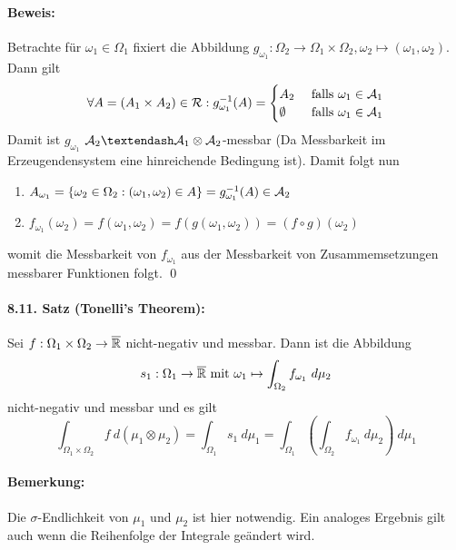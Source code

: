 \paragraph{Beweis:}Betrachte f\"ur $\omega_1\in\Omega_1$ fixiert die Abbildung $g_{\omega_1}:\Omega_2\to\Omega_1\times\Omega_2,\omega_2\mapsto(\omega_1,\omega_2)$. Dann gilt
\begin{align*}
    \forall A=(A_1\times A_2)\in\mathcal{R}:g_{\omega_1}^{-1}(A)=
    \begin{cases}
        A_2&\text{ falls }\omega_1\in\mathcal{A}_1\\
        \emptyset&\text{ falls }\omega_1\in\mathcal{A}_1
    \end{cases}
\end{align*}
Damit ist $g_{\omega_1}$ $\A_2\textendash\A_1\otimes\A_2$-messbar (Da Messbarkeit im Erzeugendensystem eine hinreichende Bedingung ist). Damit folgt nun
\begin{enumerate}[label=(\roman*)]
    \item $A_{\omega_1}=\left\{\omega_2\in\Omega_2:(\omega_1,\omega_2)\in A\right\}=g_{\omega_1}^{-1}(A)\in\mathcal{A}_2$
    \item $f_{\omega_1}(\omega_2)=f(\omega_1,\omega_2)=f(g(\omega_1,\omega_2))=(f\circ g)(\omega_2)$
\end{enumerate}
womit die Messbarkeit von $f_{\omega_1}$ aus der Messbarkeit von Zusammemsetzungen messbarer Funktionen folgt. \qed

\paragraph{8.11. Satz (Tonelli's Theorem):}Sei $f:\Omega_1\times\Omega_2\to\overline{\mathbb{R}}$ nicht-negativ und messbar. Dann ist die Abbildung
$$s_1:\Omega_1\to\overline{\mathbb{R}}\text{ mit }\omega_1\mapsto\int_{\Omega_2}f_{\omega_1}\ d\mu_2$$
nicht-negativ und messbar und es gilt
$$\int_{\Omega_1\times\Omega_2}f \ d(\mu_1\otimes\mu_2)=\int_{\Omega_1}s_1\ d\mu_1=\int_{\Omega_1}\left(\int_{\Omega_2}f_{\omega_1}\ d\mu_2\right)\ d\mu_1$$

\paragraph{Bemerkung:}Die $\sigma$-Endlichkeit von $\mu_1$ und $\mu_2$ ist hier notwendig. Ein analoges Ergebnis gilt auch wenn die Reihenfolge der Integrale ge\"andert wird.

